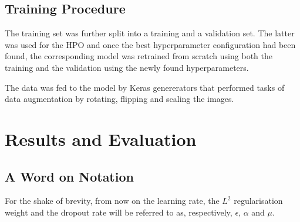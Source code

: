 \subsection{Training Procedure}
The training set was further split into a training and a validation set. The latter was used for the HPO and once the best hyperparameter configuration had been found, the corresponding model was retrained from scratch using both the training and the validation using the newly found hyperparameters.

The data was fed to the model by Keras genererators that performed tasks of data augmentation by rotating, flipping and scaling the images.


\section{Results and Evaluation}
\subsection{A Word on Notation}
For the shake of brevity, from now on the learning rate, the $L^2$ regularisation weight and the dropout rate will be referred to as, respectively, $\epsilon$, $\alpha$ and $\mu$.

